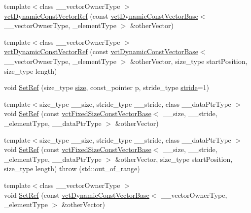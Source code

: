 \begin{DoxyCompactItemize}
\item 
{\footnotesize template$<$class \+\_\+\+\_\+vector\+Owner\+Type $>$ }\\\hyperlink{classvct_dynamic_const_vector_ref_a83a3e9d3b6116a72b45edf4999bc106a}{vct\+Dynamic\+Const\+Vector\+Ref} (const \hyperlink{classvct_dynamic_const_vector_base}{vct\+Dynamic\+Const\+Vector\+Base}$<$ \+\_\+\+\_\+vector\+Owner\+Type, \+\_\+element\+Type $>$ \&other\+Vector)
\item 
{\footnotesize template$<$class \+\_\+\+\_\+vector\+Owner\+Type $>$ }\\\hyperlink{classvct_dynamic_const_vector_ref_a168c520aca6ae854b40aea182694ef98}{vct\+Dynamic\+Const\+Vector\+Ref} (const \hyperlink{classvct_dynamic_const_vector_base}{vct\+Dynamic\+Const\+Vector\+Base}$<$ \+\_\+\+\_\+vector\+Owner\+Type, \+\_\+element\+Type $>$ \&other\+Vector, size\+\_\+type start\+Position, size\+\_\+type length)
\item 
void \hyperlink{classvct_dynamic_const_vector_ref_a25ea281066863d915ea0bd65092d94b5}{Set\+Ref} (size\+\_\+type \hyperlink{classvct_dynamic_const_vector_base_a79950d8cced7fd4e790d9ac2ca1c43a7}{size}, const\+\_\+pointer p, stride\+\_\+type \hyperlink{classvct_dynamic_const_vector_base_af0440ce847480b353e9f85edccc03158}{stride}=1)
\item 
{\footnotesize template$<$size\+\_\+type \+\_\+\+\_\+size, stride\+\_\+type \+\_\+\+\_\+stride, class \+\_\+\+\_\+data\+Ptr\+Type $>$ }\\void \hyperlink{classvct_dynamic_const_vector_ref_ada97f195fe90e1bbf50b51fe4452cacb}{Set\+Ref} (const \hyperlink{classvct_fixed_size_const_vector_base}{vct\+Fixed\+Size\+Const\+Vector\+Base}$<$ \+\_\+\+\_\+size, \+\_\+\+\_\+stride, \+\_\+element\+Type, \+\_\+\+\_\+data\+Ptr\+Type $>$ \&other\+Vector)
\item 
{\footnotesize template$<$size\+\_\+type \+\_\+\+\_\+size, stride\+\_\+type \+\_\+\+\_\+stride, class \+\_\+\+\_\+data\+Ptr\+Type $>$ }\\void \hyperlink{classvct_dynamic_const_vector_ref_aef35ff565181d7744063dfc809ebea55}{Set\+Ref} (const \hyperlink{classvct_fixed_size_const_vector_base}{vct\+Fixed\+Size\+Const\+Vector\+Base}$<$ \+\_\+\+\_\+size, \+\_\+\+\_\+stride, \+\_\+element\+Type, \+\_\+\+\_\+data\+Ptr\+Type $>$ \&other\+Vector, size\+\_\+type start\+Position, size\+\_\+type length)  throw (std\+::out\+\_\+of\+\_\+range)
\item 
{\footnotesize template$<$class \+\_\+\+\_\+vector\+Owner\+Type $>$ }\\void \hyperlink{classvct_dynamic_const_vector_ref_a39a73a7adfb2e8e7568d47d717a6d2a3}{Set\+Ref} (const \hyperlink{classvct_dynamic_const_vector_base}{vct\+Dynamic\+Const\+Vector\+Base}$<$ \+\_\+\+\_\+vector\+Owner\+Type, \+\_\+element\+Type $>$ \&other\+Vector)

\end{DoxyCompactItemize}
